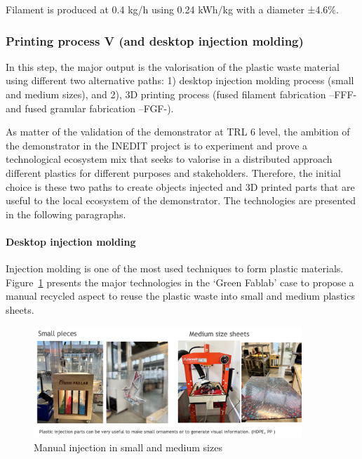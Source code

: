 \documentclass[
  11pt,
]{article}
\let\oldparagraph\paragraph
\renewcommand{\paragraph}[1]{\oldparagraph{#1}\mbox{}}
\let\paragraph\oldparagraph
\begin{document}
Filament is produced at 0.4 kg/h using 0.24 kWh/kg with a diameter
±4.6\%.

\hypertarget{printing-process-v-and-desktop-injection-molding}{%
\subsubsection{Printing process V (and desktop injection
molding)}\label{printing-process-v-and-desktop-injection-molding}}

In this step, the major output is the valorisation of the plastic waste
material using different two alternative paths: 1) desktop injection
molding process (small and medium sizes), and 2), 3D printing process
(fused filament fabrication --FFF- and fused granular fabrication
--FGF-).

As matter of the validation of the demonstrator at TRL 6 level, the
ambition of the demonstrator in the INEDIT project is to experiment and
prove a technological ecosystem mix that seeks to valorise in a
distributed approach different plastics for different purposes and
stakeholders. Therefore, the initial choice is these two paths to create
objects injected and 3D printed parts that are useful to the local
ecosystem of the demonstrator. The technologies are presented in the
following paragraphs.

\hypertarget{desktop-injection-molding}{%
\paragraph{Desktop injection molding}\label{desktop-injection-molding}}

Injection molding is one of the most used techniques to form plastic
materials.\\
Figure~\ref{fig-injection} presents the major technologies in the `Green
Fablab' case to propose a manual recycled aspect to reuse the plastic
waste into small and medium plastics sheets.

\begin{figure}[H]

{\centering \includegraphics[width=0.9\textwidth,height=\textheight]{figures/printing/injectin-00.jpg}

}

\caption{\label{fig-injection}Manual injection in small and medium
sizes}

\end{figure}
\end{document}
